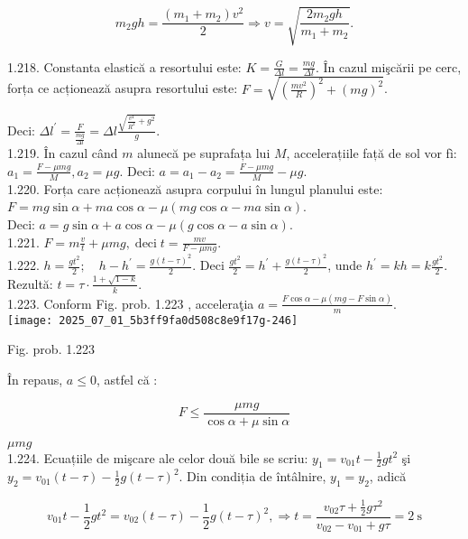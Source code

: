 $$
m_{2} g h=\frac{\left(m_{1}+m_{2}\right) v^{2}}{2} \Rightarrow v=\sqrt{\frac{2 m_{2} g h}{m_{1}+m_{2}}} .
$$

1.218. Constanta elastică a resortului este: $K=\frac{G}{\Delta l}=\frac{m g}{\Delta l}$. În cazul mişcării pe cerc, forța ce acționează asupra resortului este: $F=\sqrt{\left(\frac{m v^{2}}{R}\right)^{2}+(m g)^{2}}$.

Deci: $\Delta l^{\prime}=\frac{F}{\frac{m g}{\Delta l}}=\Delta l \frac{\sqrt{\frac{v^{4}}{R^{2}}+g^{2}}}{g}$.\\
1.219. În cazul când $m$ alunecă pe suprafața lui $M$, accelerațiile față de sol vor fì: $a_{1}=\frac{F-\mu m g}{M}, a_{2}=\mu g$. Deci: $a=a_{1}-a_{2}=\frac{F-\mu m g}{M}-\mu g$.\\
1.220. Forța care acționează asupra corpului în lungul planului este:\\
$F=m g \sin \alpha+m a \cos \alpha-\mu(m g \cos \alpha-m a \sin \alpha)$.\\
Deci: $a=g \sin \alpha+a \cos \alpha-\mu(g \cos \alpha-a \sin \alpha)$.\\
1.221. $F=m \frac{v}{t}+\mu m g, \operatorname{deci} t=\frac{m v}{F-\mu m g}$.\\
1.222. $h=\frac{g t^{2}}{2} ; \quad h-h^{\prime}=\frac{g(t-\tau)^{2}}{2}$. Deci $\frac{g t^{2}}{2}=h^{\prime}+\frac{g(t-\tau)^{2}}{2}$, unde $h^{\prime}=k h=k \frac{g t^{2}}{2}$. Rezultă: $t=\tau \cdot \frac{1+\sqrt{1-k}}{k}$.\\
1.223. Conform Fig. prob. 1.223 , acceleraţia $a=\frac{F \cos \alpha-\mu(m g-F \sin \alpha)}{m}$.\\
\texttt{[image: 2025\_07\_01\_5b3ff9fa0d508c8e9f17g-246]}

Fig. prob. 1.223

În repaus, $a \leq 0$, astfel că :

$$
F \leq \frac{\mu m g}{\cos \alpha+\mu \sin \alpha}
$$

$\mu m g$\\
1.224. Ecuațiile de mişcare ale celor două bile se scriu: $y_{1}=v_{01} t-\frac{1}{2} g t^{2}$ şi $y_{2}=v_{01}(t-\tau)-\frac{1}{2} g(t-\tau)^{2}$. Din condiția de întâlnire, $y_{1}=y_{2}$, adică

$$
v_{01} t-\frac{1}{2} g t^{2}=v_{02}(t-\tau)-\frac{1}{2} g(t-\tau)^{2}, \Rightarrow t=\frac{v_{02} \tau+\frac{1}{2} g \tau^{2}}{v_{02}-v_{01}+g \tau}=2 \mathrm{~s}
$$

